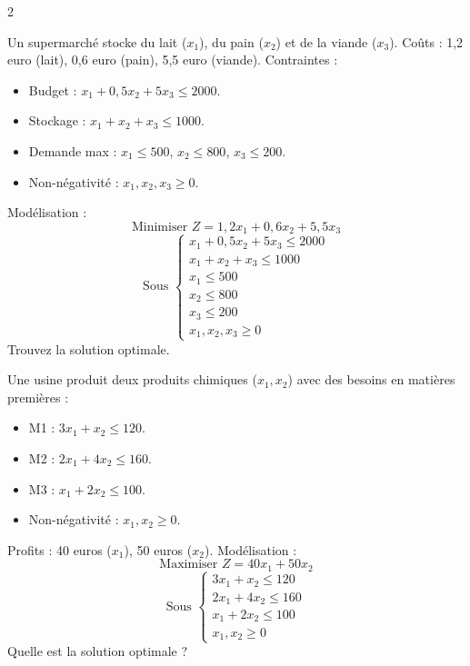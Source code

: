 \begin{multicols}{2}
\begin{exercice}
	Un supermarché stocke du lait (\(x_1\)), du pain (\(x_2\)) et de la viande (\(x_3\)). Coûts : 1,2 euro (lait), 0,6 euro (pain), 5,5 euro (viande). Contraintes :
	\begin{itemize}
		\item Budget : \(x_1 + 0,5x_2 + 5x_3 \leq 2000\).
		\item Stockage : \(x_1 + x_2 + x_3 \leq 1000\).
		\item Demande max : \(x_1 \leq 500\), \(x_2 \leq 800\), \(x_3 \leq 200\).
		\item Non-négativité : \(x_1, x_2, x_3 \geq 0\).
	\end{itemize}
	Modélisation :
	\[
	\text{Minimiser } Z = 1,2x_1 + 0,6x_2 + 5,5x_3
	\]
	\[
	\text{Sous } \begin{cases}
	x_1 + 0,5x_2 + 5x_3 \leq 2000 \\
	x_1 + x_2 + x_3 \leq 1000 \\
	x_1 \leq 500 \\
	x_2 \leq 800 \\
	x_3 \leq 200 \\
	x_1, x_2, x_3 \geq 0
	\end{cases}
	\]
	Trouvez la solution optimale.
\end{exercice}

\begin{exercice}
	Une usine produit deux produits chimiques (\(x_1, x_2\)) avec des besoins en matières premières :
	\begin{itemize}
		\item M1 : \(3x_1 + x_2 \leq 120\).
		\item M2 : \(2x_1 + 4x_2 \leq 160\).
		\item M3 : \(x_1 + 2x_2 \leq 100\).
		\item Non-négativité : \(x_1, x_2 \geq 0\).
	\end{itemize}
	Profits : 40 euros (\(x_1\)), 50 euros (\(x_2\)).
	Modélisation :
	\[
	\text{Maximiser } Z = 40x_1 + 50x_2
	\]
	\[
	\text{Sous } \begin{cases}
	3x_1 + x_2 \leq 120 \\
	2x_1 + 4x_2 \leq 160 \\
	x_1 + 2x_2 \leq 100 \\
	x_1, x_2 \geq 0
	\end{cases}
	\]
	Quelle est la solution optimale ?
\end{exercice}


\end{multicols}

